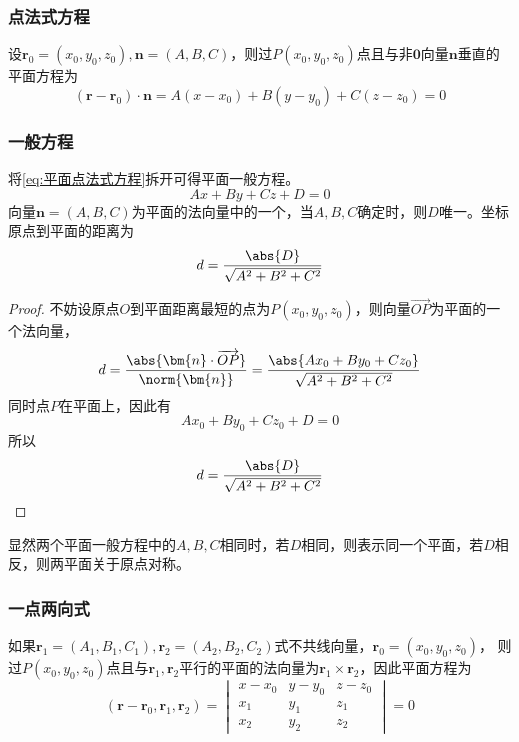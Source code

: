 \subsubsection{点法式方程}
设$\bm{r}_0=(x_0,y_0,z_0),\bm{n}=(A,B,C)$，则过$P(x_0,y_0,z_0)$点且与非$\bm{0}$向量$\bm{n}$垂直的平面方程为
\begin{equation}
    \label{eq:平面点法式方程}
    (\bm{r}-\bm{r}_0)\cdot \bm{n} = A(x-x_0) + B(y-y_0) + C(z-z_0) = 0
\end{equation}

\subsubsection{一般方程}
将\ref{eq:平面点法式方程}拆开可得平面一般方程。
\begin{equation}
    \label{eq:平面一般方程}
    Ax + By + Cz + D = 0
\end{equation}
向量$\bm{n}=(A,B,C)$为平面的法向量中的一个，当$A,B,C$确定时，则$D$唯一。坐标原点到平面的距离为
\begin{equation}
    d = \frac{\abs{D}}{\sqrt{A^2+B^2+C^2}}
\end{equation}
\begin{proof}
    不妨设原点$O$到平面距离最短的点为$P(x_0,y_0,z_0)$，则向量$\overrightarrow{OP}$为平面的一个法向量，
    \[
        d
        = \frac{\abs{\bm{n}\cdot\overrightarrow{OP}}}{\norm{\bm{n}}}
        = \frac{\abs{Ax_0 + By_0 + Cz_0}}{\sqrt{A^2+B^2+C^2}}
    \]
    同时点$P$在平面上，因此有
    \[ Ax_0 + By_0 + Cz_0 + D = 0 \]
    所以
    \[ d= \frac{\abs{D}}{\sqrt{A^2+B^2+C^2}} \]
\end{proof}
显然两个平面一般方程中的$A,B,C$相同时，若$D$相同，则表示同一个平面，若$D$相反，则两平面关于原点对称。

\subsubsection{一点两向式}
如果$\bm{r}_1=(A_1,B_1,C_1),\bm{r}_2=(A_2,B_2,C_2)$式不共线向量，$\bm{r}_0=(x_0,y_0,z_0)$，
则过$P(x_0,y_0,z_0)$点且与$\bm{r}_1,\bm{r}_2$平行的平面的法向量为$\bm{r}_1\times\bm{r}_2$，因此平面方程为
\begin{equation}
    \label{eq:平面一点两向式}
    (\bm{r}-\bm{r}_0,\bm{r}_1,\bm{r}_2)=
    \begin{vmatrix}
        x-x_0 & y-y_0 & z-z_0 \\
        x_1   & y_1   & z_1   \\
        x_2   & y_2   & z_2
    \end{vmatrix}
    =0
\end{equation}

